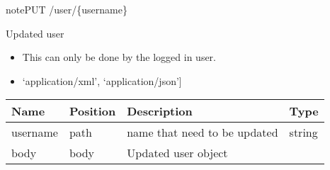 \documentclass[letterpaper,10pt,english]{sphinxmanual}
\begin{document}
\begin{sphinxadmonition}{note}{PUT /user/\{username\}}

Updated user\begin{itemize}
\item {} 
This can only be done by the logged in user.

\item {} 
\sphinxstylestrong{Produces: 
}{[}‘application/xml’, ‘application/json’{]}

\end{itemize}




\begin{savenotes}\sphinxattablestart
\centering
\begin{tabulary}{\linewidth}[t]{|T|T|T|T|}
\hline
\sphinxstyletheadfamily 
Name
&\sphinxstyletheadfamily 
Position
&\sphinxstyletheadfamily 
Description
&\sphinxstyletheadfamily 
Type
\\
\hline
username
&
path
&
name that need to be updated
&
string
\\
\hline
body
&
body
&
Updated user object
&

\\
\hline
\end{tabulary}
\par
\sphinxattableend\end{savenotes}



\end{sphinxadmonition}
\end{document}
